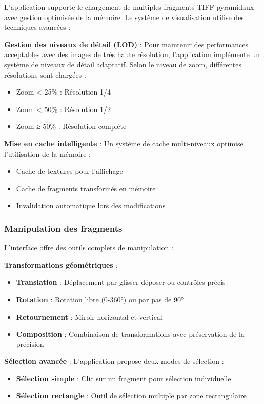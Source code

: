 \documentclass[12pt,a4paper]{report}
\begin{document}
L'application supporte le chargement de multiples fragments TIFF pyramidaux avec gestion optimisée de la mémoire. Le système de visualisation utilise des techniques avancées :

\textbf{Gestion des niveaux de détail (LOD)} : Pour maintenir des performances acceptables avec des images de très haute résolution, l'application implémente un système de niveaux de détail adaptatif. Selon le niveau de zoom, différentes résolutions sont chargées :
\begin{itemize}
\item Zoom < 25\% : Résolution 1/4
\item Zoom < 50\% : Résolution 1/2  
\item Zoom ≥ 50\% : Résolution complète
\end{itemize}

\textbf{Mise en cache intelligente} : Un système de cache multi-niveaux optimise l'utilisation de la mémoire :
\begin{itemize}
\item Cache de textures pour l'affichage
\item Cache de fragments transformés en mémoire
\item Invalidation automatique lors des modifications
\end{itemize}

\subsubsection{Manipulation des fragments}

L'interface offre des outils complets de manipulation :

\textbf{Transformations géométriques} :
\begin{itemize}
\item \textbf{Translation} : Déplacement par glisser-déposer ou contrôles précis
\item \textbf{Rotation} : Rotation libre (0-360°) ou par pas de 90°
\item \textbf{Retournement} : Miroir horizontal et vertical
\item \textbf{Composition} : Combinaison de transformations avec préservation de la précision
\end{itemize}

\textbf{Sélection avancée} : L'application propose deux modes de sélection :
\begin{itemize}
\item \textbf{Sélection simple} : Clic sur un fragment pour sélection individuelle
\item \textbf{Sélection rectangle} : Outil de sélection multiple par zone rectangulaire
\end{itemize}
\end{document}
